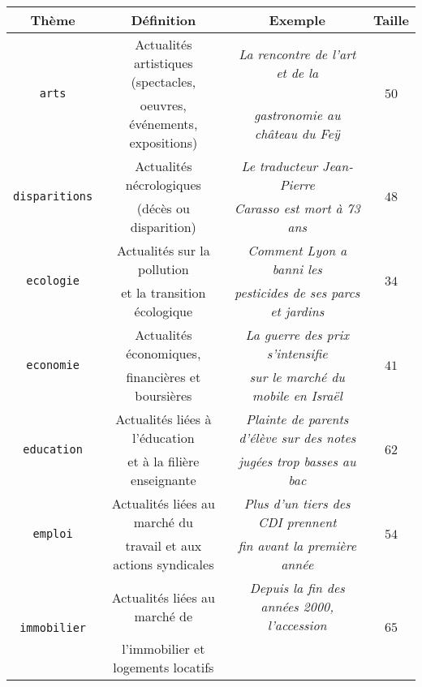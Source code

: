 		\begin{table}[!htb]
			\begin{center}
			\begin{scriptsize}
			\begin{tabular}{|c|c|c|c|}
			
				\hline
				\textbf{Thème}
					& \textbf{Définition}
					& \textbf{Exemple}
					& \textbf{Taille}
					\tabularnewline
					\hline
				
				\multirow{2}{*}{\texttt{arts}}
					& Actualités artistiques (spectacles,
					& \textit{La rencontre de l'art et de la }
					& \multirow{2}{*}{$50$}
					\tabularnewline
					& oeuvres, événements, expositions)
					& \textit{gastronomie au château du Feÿ}
					&
					\tabularnewline
					\hline
				\multirow{2}{*}{\texttt{disparitions}}
					& Actualités nécrologiques 
					& \textit{Le traducteur Jean-Pierre}
					& \multirow{2}{*}{$48$}
					\tabularnewline
					& (décès ou disparition)
					& \textit{Carasso est mort à 73 ans}
					&
					\tabularnewline
					\hline
				\multirow{2}{*}{\texttt{ecologie}}
					& Actualités sur la pollution
					& \textit{Comment Lyon a banni les}
					& \multirow{2}{*}{$34$}
					\tabularnewline
					& et la transition écologique
					& \textit{pesticides de ses parcs et jardins}
					&
					\tabularnewline
					\hline
				\multirow{2}{*}{\texttt{economie}}
					& Actualités économiques,
					& \textit{La guerre des prix s'intensifie}
					& \multirow{2}{*}{$41$}
					\tabularnewline
					& financières et boursières
					& \textit{sur le marché du mobile en Israël}
					&
					\tabularnewline
					\hline
				\multirow{2}{*}{\texttt{education}}
					& Actualités liées à l'éducation
					& \textit{Plainte de parents d'élève sur des notes}
					& \multirow{2}{*}{$62$}
					\tabularnewline
					& et à la filière enseignante
					& \textit{jugées trop basses au bac}
					&
					\tabularnewline
					\hline
				\multirow{2}{*}{\texttt{emploi}}
					& Actualités liées au marché du
					& \textit{Plus d'un tiers des CDI prennent}
					& \multirow{2}{*}{$54$}
					\tabularnewline
					& travail et aux actions syndicales
					& \textit{ fin avant la première année}
					&
					\tabularnewline
					\hline
				\multirow{2}{*}{\texttt{immobilier}}
					& Actualités liées au marché de
					& \textit{Depuis la fin des années 2000, l'accession}
					& \multirow{2}{*}{$65$}
					\tabularnewline
					& l'immobilier et logements locatifs

\end{tabular}
\end{scriptsize}
\end{center}
\end{table}
